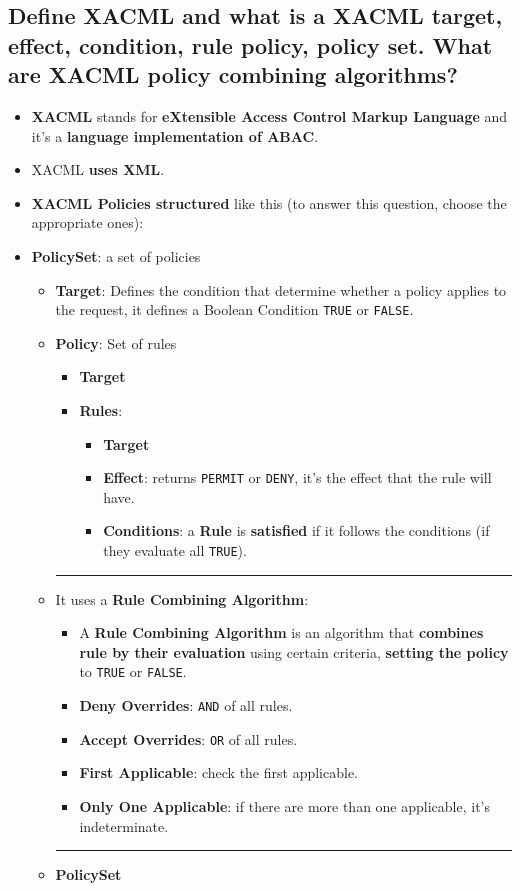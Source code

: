 \documentclass[9pt, letterpaper]{article}
\begin{document}
\subsection{Define XACML and what is a XACML target, effect, condition, rule policy, policy set. What are XACML policy combining algorithms?}
\begin{itemize}
	\item \textbf{XACML} stands for \textbf{eXtensible Access Control Markup Language} and it's a \textbf{language implementation of ABAC}.
	\item XACML \textbf{uses XML}.
	\item \textbf{XACML Policies structured} like this (to answer this question, choose the appropriate ones):
	\item \textbf{PolicySet}: a set of policies
	      \begin{itemize}
		      \item \textbf{Target}: Defines the condition that determine whether a policy applies to the request, it defines a Boolean Condition {\tt TRUE} or {\tt FALSE}.
		      \item \textbf{Policy}: Set of rules
		            \begin{itemize}
			            \item \textbf{Target}
			            \item \textbf{Rules}:
			                  \begin{itemize}
				                  \item \textbf{Target}
				                  \item \textbf{Effect}: returns {\tt PERMIT} or {\tt DENY}, it's the effect that the rule will have.
				                  \item \textbf{Conditions}: a \textbf{Rule} is \textbf{satisfied} if it follows the conditions (if they evaluate all {\tt TRUE}).
			                  \end{itemize}
		            \end{itemize}
		            {\noindent\color{gray}\rule{16.5cm}{0.4pt}}
		      \item It uses a \textbf{Rule Combining Algorithm}:
		            \begin{itemize}
			            \item A \textbf{Rule Combining Algorithm} is an algorithm that \textbf{combines rule by their evaluation} using certain criteria, \textbf{setting the policy} to {\tt TRUE} or {\tt FALSE}.
			            \item \textbf{Deny Overrides}: {\tt AND} of all rules.
			            \item \textbf{Accept Overrides}: {\tt OR}  of all rules.
			            \item \textbf{First Applicable}: check the first applicable.
			            \item \textbf{Only One Applicable}: if there are more than one applicable, it's indeterminate.
		            \end{itemize}
		            {\noindent\color{gray}\rule{16.5cm}{0.4pt}}
		      \item \textbf{PolicySet}
	      \end{itemize}
\end{itemize}
\end{document}
